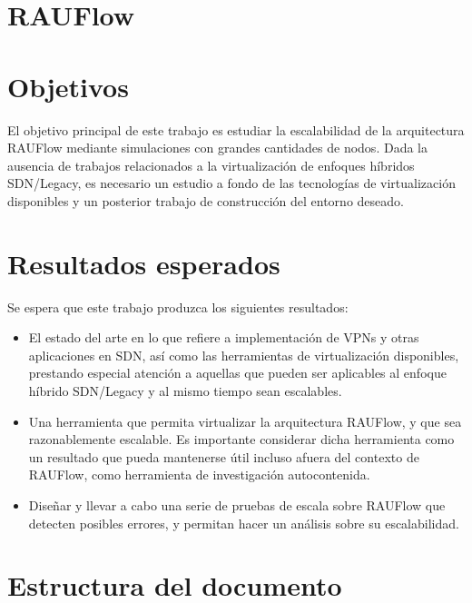 \section{RAUFlow}

\section{Objetivos}
El objetivo principal de este trabajo es estudiar la escalabilidad de la arquitectura RAUFlow mediante simulaciones con grandes cantidades de nodos. Dada la ausencia de trabajos relacionados a la virtualización de enfoques híbridos SDN/Legacy, es necesario un estudio a fondo de las tecnologías de virtualización disponibles y un posterior trabajo de construcción del entorno deseado.

\section{Resultados esperados}
Se espera que este trabajo produzca los siguientes resultados:
\begin{itemize}
	\item El estado del arte en lo que refiere a implementación de VPNs y otras aplicaciones en SDN, así como las herramientas de virtualización disponibles, prestando especial atención a aquellas que pueden ser aplicables al enfoque híbrido SDN/Legacy y al mismo tiempo sean escalables.
	\item Una herramienta que permita virtualizar la arquitectura RAUFlow, y que sea razonablemente escalable. Es importante considerar dicha herramienta como un resultado que pueda mantenerse útil incluso afuera del contexto de RAUFlow, como herramienta de investigación autocontenida.
	\item Diseñar y llevar a cabo una serie de pruebas de escala sobre RAUFlow que detecten posibles errores, y permitan hacer un análisis sobre su escalabilidad.
\end{itemize}

\section{Estructura del documento}


